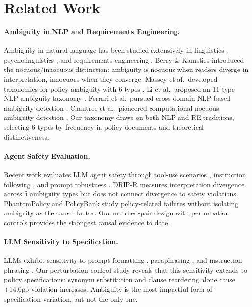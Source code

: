 \documentclass[11pt]{article}
\begin{document}
\section{Related Work}

\paragraph{Ambiguity in NLP and Requirements Engineering.}
Ambiguity in natural language has been studied extensively in linguistics \cite{wasow2005,frazier1982}, psycholinguistics \cite{ferreira2002}, and requirements engineering \cite{berry2003,chantree2006}. Berry \& Kamsties introduced the nocuous/innocuous distinction: ambiguity is nocuous when readers diverge in interpretation, innocuous when they converge. Massey et al.\ developed taxonomies for policy ambiguity with 6 types \cite{massey2014}. Li et al.\ proposed an 11-type NLP ambiguity taxonomy \cite{li2024}. Ferrari et al.\ pursued cross-domain NLP-based ambiguity detection \cite{ferrari2017}. Chantree et al.\ pioneered computational nocuous ambiguity detection \cite{chantree2006,chantree2008}. Our taxonomy draws on both NLP and RE traditions, selecting 6 types by frequency in policy documents and theoretical distinctiveness.

\paragraph{Agent Safety Evaluation.}
Recent work evaluates LLM agent safety through tool-use scenarios \cite{ruan2024toolemu}, instruction following \cite{zhou2023ifeval}, and prompt robustness \cite{sclar2024}. DRIP-R measures interpretation divergence across 5 ambiguity types but does not connect divergence to safety violations. PhantomPolicy and PolicyBank study policy-related failures without isolating ambiguity as the causal factor. Our matched-pair design with perturbation controls provides the strongest causal evidence to date.

\paragraph{LLM Sensitivity to Specification.}
LLMs exhibit sensitivity to prompt formatting \cite{lu2022}, paraphrasing \cite{sclar2024}, and instruction phrasing \cite{zhou2023ifeval}. Our perturbation control study reveals that this sensitivity extends to policy specifications: synonym substitution and clause reordering alone cause +14.0pp violation increases. Ambiguity is the most impactful form of specification variation, but not the only one.
\end{document}
